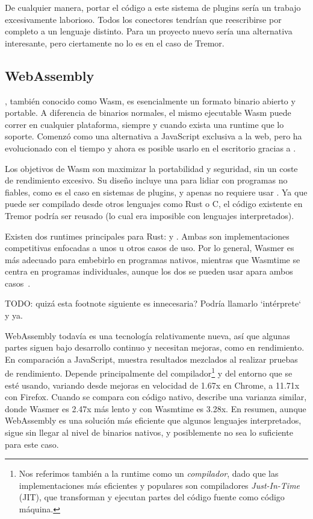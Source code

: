 De cualquier manera, portar el código a este sistema de plugins sería un trabajo
excesivamente laborioso. Todos los conectores tendrían que reescribirse por
completo a un lenguaje distinto. Para un proyecto nuevo sería una alternativa
interesante, pero ciertamente no lo es en el caso de Tremor.

\subsection{WebAssembly}

, también conocido como Wasm, es esencialmente un formato binario
abierto y portable. A diferencia de binarios normales, el mismo ejecutable Wasm
puede correr en cualquier plataforma, siempre y cuando exista una runtime que lo
soporte. Comenzó como una alternativa a JavaScript exclusiva a la web, pero ha
evolucionado con el tiempo y ahora es posible usarlo en el escritorio gracias a
.

Los objetivos de Wasm son maximizar la portabilidad y seguridad, sin un coste de
rendimiento excesivo. Su diseño incluye una \sandbox para lidiar con programas
no fiables, como es el caso en sistemas de plugins, y apenas no requiere usar
\unsafe. Ya que puede ser compilado desde otros lenguajes como Rust o C, el
código existente en Tremor podría ser reusado (lo cual era imposible con
lenguajes interpretados).

Existen dos runtimes principales para Rust:  y
. Ambas son implementaciones competitivas enfocadas a unos u
otros casos de uso. Por lo general, Wasmer es más adecuado para embebirlo en
programas nativos, mientras que Wasmtime se centra en programas individuales,
aunque los dos se pueden usar apara ambos casos~\cite{wasmwikiusage}.

TODO: quizá esta footnote siguiente es innecesaria? Podría llamarlo `intérprete`
y ya.

WebAssembly todavía es una tecnología relativamente nueva, así que algunas
partes siguen bajo desarrollo continuo y necesitan mejoras, como en rendimiento.
En comparación a JavaScript, \textcite{jangda2019not} muestra resultados
mezclados al realizar pruebas de rendimiento. Depende principalmente del
compilador\footnote{Nos referimos también a la runtime como un
\emph{compilador}, dado que las implementaciones más eficientes y populares son
compiladores \emph{Just-In-Time} (JIT), que transforman y ejecutan partes del
código fuente como código máquina.} y del entorno que se esté usando, variando
desde mejoras en velocidad de 1.67x en Chrome, a 11.71x con Firefox. Cuando se
compara con código nativo, \textcite{libsodiumwasmperf} describe una varianza
similar, donde Wasmer es 2.47x más lento y con Wasmtime es 3.28x. En resumen,
aunque WebAssembly es una solución más eficiente que algunos lenguajes
interpretados, sigue sin llegar al nivel de binarios nativos, y posiblemente no
sea lo suficiente para este caso.

